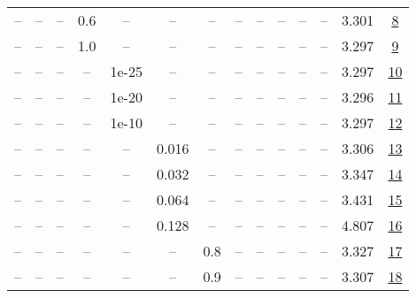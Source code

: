 \begin{table}[H]
\begin{tabular}{cccccccccccccc}
-- & -- & -- & 0.6 & -- & -- & -- & -- & -- & -- & -- & -- & 3.301 & \href{https://wandb.ai/stanford-mercury/optimizer-scaling/runs/sweep-130m-10B-muonzcbcf0elr0.008-wd0.1-minlr0-warmup0-b10.8-b20-b3af8f}{8} \\
-- & -- & -- & 1.0 & -- & -- & -- & -- & -- & -- & -- & -- & 3.297 & \href{https://wandb.ai/stanford-mercury/optimizer-scaling/runs/sweep-130m-10B-muonze94b59lr0.008-wd0.1-minlr0-warmup0-b10.8-b20-fee6f0}{9} \\
-- & -- & -- & -- & 1e-25 & -- & -- & -- & -- & -- & -- & -- & 3.297 & \href{https://wandb.ai/stanford-mercury/optimizer-scaling/runs/sweep-130m-10B-muonz9a14ablr0.008-wd0.1-minlr0-warmup0-b10.8-b20-219e6f}{10} \\
-- & -- & -- & -- & 1e-20 & -- & -- & -- & -- & -- & -- & -- & 3.296 & \href{https://wandb.ai/stanford-mercury/optimizer-scaling/runs/sweep-130m-10B-muonz32b0f9lr0.008-wd0.1-minlr0-warmup0-b10.8-b20-c69265}{11} \\
-- & -- & -- & -- & 1e-10 & -- & -- & -- & -- & -- & -- & -- & 3.297 & \href{https://wandb.ai/stanford-mercury/optimizer-scaling/runs/sweep-130m-10B-muonz0cc0c3lr0.008-wd0.1-minlr0-warmup0-b10.8-b20-afc344}{12} \\
-- & -- & -- & -- & -- & 0.016 & -- & -- & -- & -- & -- & -- & 3.306 & \href{https://wandb.ai/stanford-mercury/optimizer-scaling/runs/sweep-130m-10B-muonz04e7d1lr0.016-wd0.1-minlr0-warmup0-b10.8-b20-0bfb9c}{13} \\
-- & -- & -- & -- & -- & 0.032 & -- & -- & -- & -- & -- & -- & 3.347 & \href{https://wandb.ai/stanford-mercury/optimizer-scaling/runs/sweep-130m-10B-muonz305b82lr0.032-wd0.1-minlr0-warmup0-b10.8-b20-c13c8a}{14} \\
-- & -- & -- & -- & -- & 0.064 & -- & -- & -- & -- & -- & -- & 3.431 & \href{https://wandb.ai/stanford-mercury/optimizer-scaling/runs/sweep-130m-10B-muonj4c9af2lr0.064-wd0.1-minlr0-warmup0-b10.8-b20-a5a6e2}{15} \\
-- & -- & -- & -- & -- & 0.128 & -- & -- & -- & -- & -- & -- & 4.807 & \href{https://wandb.ai/stanford-mercury/optimizer-scaling/runs/sweep-130m-10B-muonzc9fa46lr0.128-wd0.1-minlr0-warmup0-b10.8-b20-d85c56}{16} \\
-- & -- & -- & -- & -- & -- & 0.8 & -- & -- & -- & -- & -- & 3.327 & \href{https://wandb.ai/stanford-mercury/optimizer-scaling/runs/sweep-130m-10B-muonz05d5f6lr0.008-wd0.1-minlr0-warmup0-b10.8-b20-643f83}{17} \\
-- & -- & -- & -- & -- & -- & 0.9 & -- & -- & -- & -- & -- & 3.307 & \href{https://wandb.ai/stanford-mercury/optimizer-scaling/runs/sweep-130m-10B-muonz7f2e92lr0.008-wd0.1-minlr0-warmup0-b10.8-b20-4ed3f2}{18} \\

\end{tabular}
\end{table}
